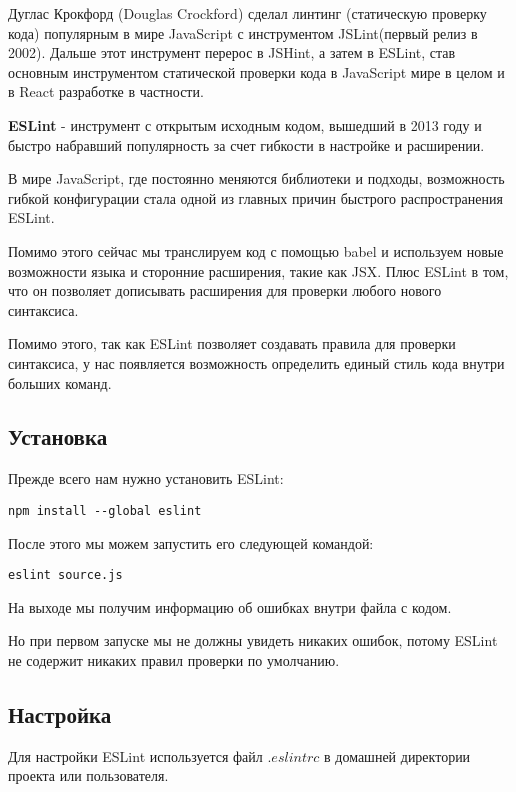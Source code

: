 Дуглас Крокфорд (Douglas Crockford) сделал линтинг (статическую проверку кода) популярным в мире JavaScript с инструментом JSLint(первый релиз в 2002). Дальше этот инструмент перерос в JSHint, а затем в ESLint, став основным инструментом статической проверки кода в JavaScript мире в целом и в React разработке в частности.

\textbf{ESLint} - инструмент с открытым исходным кодом, вышедший в 2013 году и быстро набравший популярность за счет гибкости в настройке и расширении.

В мире JavaScript, где постоянно меняются библиотеки и подходы, возможность гибкой конфигурации стала одной из главных причин быстрого распространения ESLint. 

Помимо этого сейчас мы транслируем код с помощью babel и используем новые возможности языка и сторонние расширения, такие как JSX. Плюс ESLint в том, что он позволяет дописывать расширения для проверки любого нового синтаксиса.

Помимо этого, так как ESLint позволяет создавать правила для проверки синтаксиса, у нас появляется возможность определить единый стиль кода внутри больших команд.


\subsection{Установка}

Прежде всего нам нужно установить ESLint:

\begin{lstlisting}
npm install --global eslint
\end{lstlisting}

После этого мы можем запустить его следующей командой:

\begin{lstlisting}
eslint source.js
\end{lstlisting}

На выходе мы получим информацию об ошибках внутри файла с кодом.

Но при первом запуске мы не должны увидеть никаких ошибок, потому ESLint не содержит никаких правил проверки по умолчанию.

\subsection{Настройка}

Для настройки ESLint используется файл $.eslintrc$ в домашней директории проекта или пользователя.

